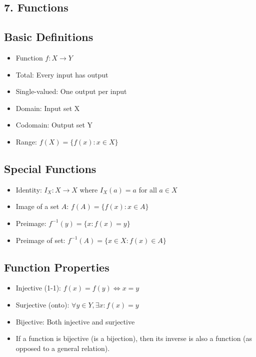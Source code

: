 \documentclass[8pt,landscape]{article}
\begin{document}
\begin{multicols*}{4}
		\section*{7. Functions}
		
		\subsection*{Basic Definitions}
		\begin{itemize}[leftmargin=*]
			\item Function $f: X \rightarrow Y$
			\item Total: Every input has output
			\item Single-valued: One output per input
			\item Domain: Input set X
			\item Codomain: Output set Y
			\item Range: $f(X) = \{f(x) : x \in X\}$
		\end{itemize}
		
		\subsection*{Special Functions}
		\begin{itemize}[leftmargin=*]
			\item Identity: $I_X:X\rightarrow X$ where $I_X(a)=a$ for all $a\in X$
			\item Image of a set $A$: $f(A) = \{f(x) : x \in A\}$
			\item Preimage: $f^{-1}(y) = \{x : f(x) = y\}$
			\item Preimage of set: $f^{-1}(A) = \{x\in X : f(x) \in A\}$
		\end{itemize}
		
		\subsection*{Function Properties}
		\begin{itemize}[leftmargin=*]
			\item Injective (1-1):  $f(x)=f(y)\Leftrightarrow x=y$
			\item Surjective (onto): $\forall y \in Y, \exists x: f(x) = y$
			\item Bijective: Both injective and surjective
			\item If a function is bijective (is a bijection), then its inverse is also a function (as opposed to a general relation).
		\end{itemize}
		

\end{multicols*}
\end{document}
